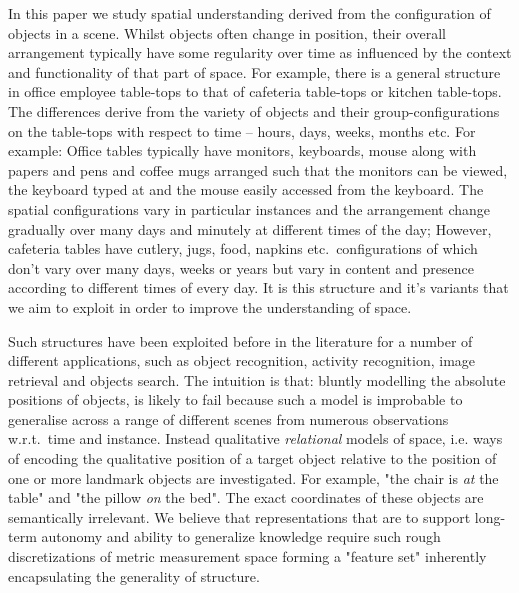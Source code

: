 \documentclass[letterpaper, 10 pt, conference]{ieeeconf}
\begin{document}
In this paper we study spatial understanding derived from the 
configuration of objects in a scene. Whilst objects often change 
in position, their overall arrangement typically have some regularity 
over time as influenced by the context and functionality of that 
part of space. For example, there is a general structure in office 
employee table-tops to that of cafeteria table-tops or kitchen table-tops.
The differences derive from the variety of objects and their 
group-configurations on the table-tops with respect to time -- hours, 
days, weeks, months etc. For example: Office tables typically 
have monitors, keyboards, mouse along with papers and pens 
and coffee mugs arranged such that the monitors can be viewed, the 
keyboard typed at and the mouse easily accessed from the keyboard. 
The spatial configurations vary in particular instances and the 
arrangement change gradually over many days and minutely at different 
times of the day; However, cafeteria tables have cutlery, jugs, food, 
napkins etc.\ configurations of which don't vary over many days, 
weeks or years but vary in content and presence according to different 
times of every day. It is this structure and it's variants that we aim 
to exploit in order to improve the understanding of space.

Such structures have been exploited before in the literature for a
number of different applications, such as object recognition, activity
recognition, image retrieval and objects search. The intuition is that:
bluntly modelling the absolute positions of objects, is likely to fail
because such a model is improbable to generalise across a range of
different scenes from numerous observations w.r.t.\ time and instance. Instead
qualitative \emph{relational} models of space, i.e. ways of encoding
the qualitative position of a target object relative to the position
of one or more landmark objects are investigated. For example, "the
chair is \textit{at} the table" and "the pillow \textit{on} the bed". 
The exact coordinates of these objects are semantically irrelevant. We believe that 
representations that are to support long-term autonomy and ability 
to generalize knowledge require such rough discretizations of metric 
measurement space forming a "feature set" inherently encapsulating the generality
of structure.
\end{document}
